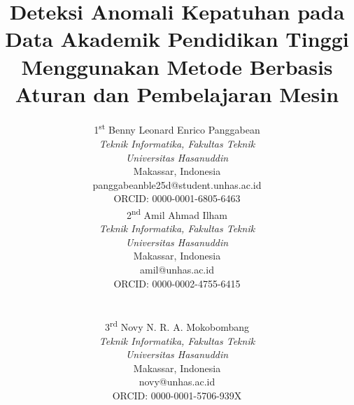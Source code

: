 \documentclass[conference]{IEEEtran}
\begin{document}
\title{Deteksi Anomali Kepatuhan pada Data Akademik Pendidikan Tinggi Menggunakan Metode Berbasis Aturan dan Pembelajaran Mesin}

\author{\parbox{\textwidth}{\centering
\parbox[t]{0.45\textwidth}{\centering
{\normalsize 1\textsuperscript{st} Benny Leonard Enrico Panggabean}\\
{\small \textit{Teknik Informatika, Fakultas Teknik} \\
\textit{Universitas Hasanuddin}\\
Makassar, Indonesia \\
panggabeanble25d@student.unhas.ac.id \\
ORCID: 0000-0001-6805-6463}}\hfill
\parbox[t]{0.45\textwidth}{\centering
{\normalsize 2\textsuperscript{nd} Amil Ahmad Ilham}\\
{\small \textit{Teknik Informatika, Fakultas Teknik} \\
\textit{Universitas Hasanuddin}\\
Makassar, Indonesia \\
amil@unhas.ac.id \\
ORCID: 0000-0002-4755-6415}}\\[2ex]
\parbox[t]{0.45\textwidth}{\centering
{\normalsize 3\textsuperscript{rd} Novy N. R. A. Mokobombang}\\
{\small \textit{Teknik Informatika, Fakultas Teknik} \\
\textit{Universitas Hasanuddin}\\
Makassar, Indonesia \\
novy@unhas.ac.id \\
ORCID: 0000-0001-5706-939X}}
}}

\maketitle
\end{document}
